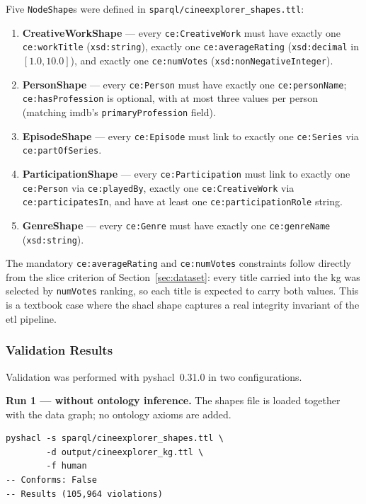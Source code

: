 Five \texttt{NodeShape}s were defined in \texttt{sparql/cineexplorer\_shapes.ttl}:

\begin{sloppypar}
\begin{enumerate}
\item \textbf{CreativeWorkShape} --- every \texttt{ce:CreativeWork} must have exactly one \texttt{ce:workTitle} (\texttt{xsd:string}), exactly one \texttt{ce:averageRating} (\texttt{xsd:decimal} in $[1.0, 10.0]$), and exactly one \texttt{ce:numVotes} (\texttt{xsd:nonNegativeInteger}).
\item \textbf{PersonShape} --- every \texttt{ce:Person} must have exactly one \texttt{ce:personName}; \texttt{ce:hasProfession} is optional, with at most three values per person (matching \ac{imdb}'s \texttt{primaryProfession} field).
\item \textbf{EpisodeShape} --- every \texttt{ce:Episode} must link to exactly one \texttt{ce:Series} via \texttt{ce:partOfSeries}.
\item \textbf{ParticipationShape} --- every \texttt{ce:Participation} must link to exactly one \texttt{ce:Person} via \texttt{ce:playedBy}, exactly one \texttt{ce:CreativeWork} via \texttt{ce:participatesIn}, and have at least one \texttt{ce:participationRole} string.
\item \textbf{GenreShape} --- every \texttt{ce:Genre} must have exactly one \texttt{ce:genreName} (\texttt{xsd:string}).
\end{enumerate}
\end{sloppypar}

The mandatory \texttt{ce:averageRating} and \texttt{ce:numVotes} constraints follow directly from the slice criterion of Section~\ref{sec:dataset}: every title carried into the \ac{kg} was selected by \texttt{numVotes} ranking, so each title is expected to carry both values. This is a textbook case where the \ac{shacl} shape captures a real integrity invariant of the \ac{etl} pipeline.

\subsubsection{Validation Results}

Validation was performed with pyshacl~0.31.0 in two configurations.

\textbf{Run 1 --- without ontology inference.} The shapes file is loaded together with the data graph; no ontology axioms are added.

\begin{verbatim}
pyshacl -s sparql/cineexplorer_shapes.ttl \
        -d output/cineexplorer_kg.ttl \
        -f human
-- Conforms: False
-- Results (105,964 violations)
\end{verbatim}

